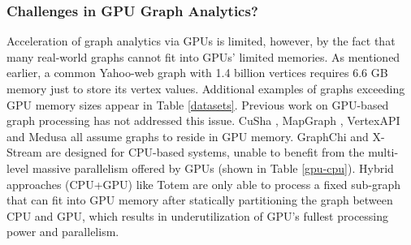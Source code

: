 \subsubsection{Challenges in GPU Graph Analytics?}
Acceleration of graph analytics via GPUs is limited, however, by the fact that many real-world graphs cannot fit into 
GPUs' limited memories. As mentioned earlier, a common Yahoo-web graph \cite{yahoo} with 1.4 billion vertices requires 6.6 GB memory 
just to store its vertex values. Additional examples of graphs exceeding GPU memory sizes appear in Table \ref{datasets}.
Previous work on GPU-based graph processing has not addressed this issue. CuSha \cite{cusha}, MapGraph \cite{mapgraph}, VertexAPI \cite{vertexapi} and Medusa \cite{medusa} all assume graphs to reside in GPU memory. GraphChi \cite{chi} and X-Stream \cite{xstream} are designed for CPU-based systems, 
unable to benefit from the multi-level massive parallelism offered by GPUs (shown in Table \ref{gpu-cpu}). Hybrid approaches (CPU+GPU) like Totem \cite{totem} are only able to process a fixed sub-graph that can fit into GPU memory after statically partitioning the graph between CPU and GPU, which results in underutilization of GPU's fullest processing power and parallelism. 
 








